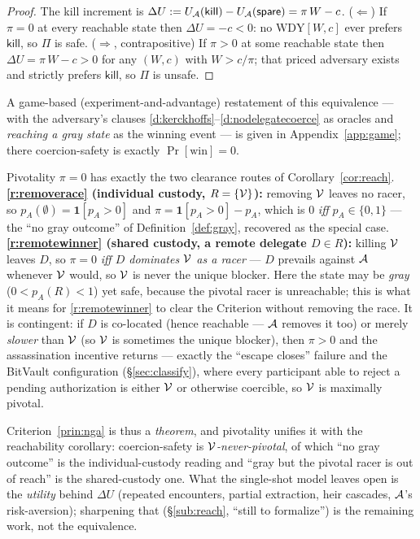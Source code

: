 \begin{proof}
The kill increment is
$\Delta U := U_{\mathcal{A}}(\textsf{kill}) - U_{\mathcal{A}}(\textsf{spare}) = \pi\,W - c$.
($\Leftarrow$) If $\pi = 0$ at every reachable state then $\Delta U = -c < 0$: no
$\mathrm{WDY}[W,c]$ ever prefers $\textsf{kill}$, so $\Pi$ is safe.
($\Rightarrow$, contrapositive) If $\pi > 0$ at some reachable state then
$\Delta U = \pi\,W - c > 0$ for any $(W,c)$ with $W > c/\pi$; that priced adversary
exists and strictly prefers $\textsf{kill}$, so $\Pi$ is unsafe.
\end{proof}

\noindent A game-based (experiment-and-advantage) restatement of this
equivalence --- with the adversary's clauses
\ref{d:kerckhoffs}--\ref{d:nodelegatecoerce} as oracles and \emph{reaching a gray
state} as the winning event --- is given in Appendix~\ref{app:game}; there
coercion-safety is exactly $\Pr[\text{win}] = 0$.

\noindent Pivotality $\pi = 0$ has exactly the two clearance routes of
Corollary~\ref{cor:reach}. \textbf{\ref{r:removerace} (individual custody, $R = \{\mathcal{V}\}$):}
removing $\mathcal{V}$ leaves no racer, so $p_A(\emptyset) = \mathbf 1[p_A>0]$ and
$\pi = \mathbf 1[p_A>0] - p_A$, which is $0$ \emph{iff} $p_A \in \{0,1\}$ --- the
``no gray outcome'' of Definition~\ref{def:gray}, recovered as the special case.
\textbf{\ref{r:remotewinner} (shared custody, a remote delegate $D \in R$):} killing $\mathcal{V}$
leaves $D$, so $\pi = 0$ \emph{iff $D$ dominates $\mathcal{V}$ as a racer} --- $D$
prevails against $\mathcal{A}$ whenever $\mathcal{V}$ would, so $\mathcal{V}$ is never the
unique blocker. Here the state may be \emph{gray} ($0 < p_A(R) < 1$) yet safe,
because the pivotal racer is unreachable; this is what it means for \ref{r:remotewinner} to clear
the Criterion without removing the race. It is contingent: if $D$ is co-located
(hence reachable --- $\mathcal{A}$ removes it too) or merely \emph{slower} than
$\mathcal{V}$ (so $\mathcal{V}$ is sometimes the unique blocker), then $\pi > 0$ and the
assassination incentive returns --- exactly the ``escape closes'' failure and the
BitVault configuration (\S\ref{sec:classify}), where every participant able to
reject a pending authorization is either $\mathcal{V}$ or otherwise coercible, so
$\mathcal{V}$ is maximally pivotal.

Criterion~\ref{prin:nga} is thus a \emph{theorem}, and pivotality unifies it with
the reachability corollary: coercion-safety is \emph{$\mathcal{V}$-never-pivotal}, of
which ``no gray outcome'' is the individual-custody reading and ``gray but the
pivotal racer is out of reach'' is the shared-custody one. What the single-shot
model leaves open is the \emph{utility} behind $\Delta U$ (repeated encounters,
partial extraction, heir cascades, $\mathcal{A}$'s risk-aversion); sharpening that
(\S\ref{sub:reach}, ``still to formalize'') is the remaining work, not the
equivalence.


